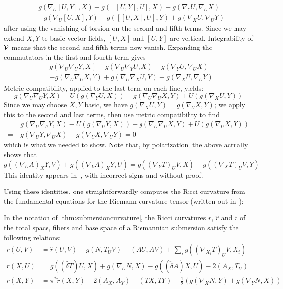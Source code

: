 \begin{myproof}
\begin{numberedlist}
		\begin{align*}
			&g(\nabla_U [U,Y],X)+g([[U,Y],U],X)-g(\nabla_Y U,\nabla_U X)\\
			&-g(\nabla_U [U,X],Y)-g([[U,X],U],Y)+g(\nabla_X U,\nabla_U Y)
		\end{align*}
		after using the vanishing of torsion on the second and fifth terms. Since we may extend $X,Y$ to basic vector fields, $[U,X]$ and $[U,Y]$ are vertical. Integrability of $\mathcal{V}$ means that the second and fifth terms now vanish. Expanding the commutators in the first and fourth term gives
		\begin{align*}
			&g(\nabla_U\nabla_U Y,X)-g(\nabla_U\nabla_Y U,X)-g(\nabla_Y U,\nabla_U X)\\
			&-g(\nabla_U \nabla_U X,Y)+g(\nabla_U\nabla_XU,Y)+g(\nabla_X U,\nabla_U Y)
		\end{align*}
		Metric compatibility, applied to the last term on each line, yields:
		\begin{equation*}
			g(\nabla_U\nabla_U Y,X)-U(g(\nabla_Y U,X))
			-g(\nabla_U \nabla_U X,Y)+U(g(\nabla_X U,Y))
		\end{equation*}
		Since we may choose $X,Y$ basic, we have $g(\nabla_X U,Y)=g(\nabla_U X,Y)$; we apply this to the second and last terms, then use metric compatibility to find
		\begin{align*}
			&g(\nabla_U\nabla_U Y,X)-U(g(\nabla_U Y,X))
			-g(\nabla_U \nabla_U X,Y)+U(g(\nabla_U X,Y))\\
			=\ &g(\nabla_U Y,\nabla_UX)-g(\nabla_UX,\nabla_UY)=0
		\end{align*}
		which is what we needed to show. Note that, by polarization, the above actually shows that
		\begin{equation*}
			g((\nabla_U A)_X Y,V)+g((\nabla_V A)_X Y,U)=
			g((\nabla_Y T)_U V,X)-g((\nabla_X T)_U V,Y)
		\end{equation*}
		This identity appears in~\cite{Gra1967}, with incorrect signs and without proof.
		\qedhere
	\end{numberedlist}
\end{myproof}

Using these identities, one straightforwardly computes the Ricci curvature from the fundamental equations for the Riemann curvature tensor (written out in~\cite[241]{Bes2008}):

\begin{prop}\label{prop:submersionRicci}
	In the notation of \cref{thm:submersioncurvature}, the Ricci curvatures $r$, $\hat r$ and $\check r$ of the total space, fibers and base space of a Riemannian submersion satisfy the following relations:
	\begin{align*}
		r(U,V)&=\hat r(U,V)-g(N,T_U V)+(AU,AV)+\sum_ig((\nabla_{X_i}T)_U V,X_i)\\
		r(X,U)&=g((\hat \delta T)U,X)+g(\nabla_U N,X)-g((\check \delta A)X,U) -2 (A_X,T_U)\\
		r(X,Y)&=\pi^*\check r(X,Y)-2(A_X,A_Y)-(TX,TY)+\frac{1}{2}(g(\nabla_X N,Y)+g(\nabla_Y N,X))
	\end{align*}
\end{prop}

